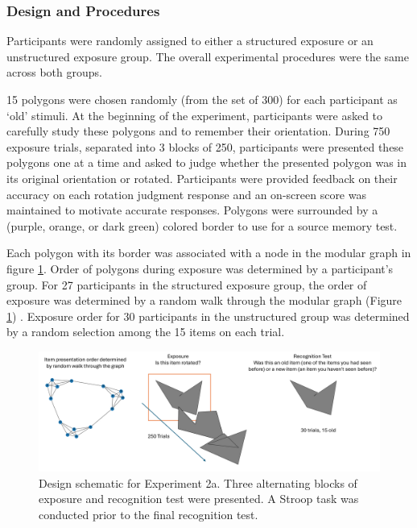 \subsubsection*{Design and Procedures}
Participants were randomly assigned to either a structured exposure or an unstructured exposure group. The overall experimental procedures were the same across both groups. 

15 polygons were chosen randomly (from the set of 300) for each participant as `old' stimuli. At the beginning of the experiment, participants were asked to carefully study these polygons and to remember their orientation. During 750 exposure trials, separated into 3 blocks of 250, participants were presented these polygons one at a time and asked to judge whether the presented polygon was in its original orientation or rotated. \ac{Participants were provided feedback on their accuracy on each rotation judgment response and an on-screen score was maintained to motivate accurate responses.} Polygons were surrounded by a (purple, orange, or dark green) colored border to use for a source memory test.

Each polygon with its border was associated with a node in the modular graph in figure \ref{fig:exp2-design}. Order of polygons during exposure was determined by a participant's group. For 27 participants in the structured exposure group, the order of exposure was determined by a random walk through the modular graph (Figure \ref{fig:exp2-design}) . Exposure order for 30 participants in the unstructured group was determined by a random selection among the 15 items on each trial. 

\begin{figure}[ht]
    \centering
    \includegraphics[width = \textwidth]{chapter_notebooks/chapter_3/figures/exp2_design.png}
    \caption{Design schematic for Experiment 2a. Three alternating blocks of exposure and recognition test were presented. A Stroop task was conducted prior to the final recognition test.}
    \label{fig:exp2-design}
\end{figure}

